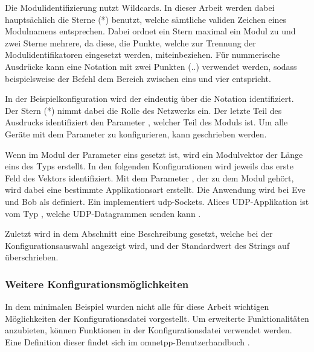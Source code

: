 Die Modulidentifizierung nutzt Wildcards. In dieser Arbeit werden dabei hauptsächlich die Sterne (*) benutzt, welche sämtliche validen Zeichen eines Modulnamens entsprechen. Dabei ordnet ein Stern maximal ein Modul zu und zwei Sterne mehrere, da diese, die Punkte, welche zur Trennung der Modulidentifikatoren eingesetzt werden, miteinbeziehen. Für nummerische Ausdrücke kann eine Notation mit zwei Punkten (..) verwendet werden, sodass beispielsweise der Befehl \ini{[1..4]} dem Bereich zwischen eins und vier entspricht.

In der Beispielkonfiguration wird der  eindeutig über die Notation  identifiziert. Der Stern (*) nimmt dabei die Rolle des Netzwerks  ein. Der letzte Teil des Ausdrucks  identifiziert den Parameter , welcher Teil des Moduls  ist. Um alle Geräte mit dem Parameter  zu konfigurieren, kann  geschrieben werden.

Wenn im Modul  der Parameter eins  gesetzt ist, wird ein Modulvektor der Länge eins des Typs  erstellt. In den folgenden Konfigurationen wird jeweils das erste Feld des Vektors  identifiziert. Mit dem Parameter , der zu dem Modul  gehört, wird dabei eine bestimmte Applikationsart erstellt. Die Anwendung  wird bei Eve und Bob als  definiert. Ein  implementiert \gls{udp}-Sockets. Alices UDP-Applikation ist vom Typ , welche UDP-Datagrammen senden kann \cite[]{InetManual2014}. 

Zuletzt wird in dem Abschnitt  eine Beschreibung  gesetzt, welche bei der Konfigurationsauswahl angezeigt wird, und der Standardwert des Strings  auf  überschrieben.

\subsubsection{Weitere Konfigurationsmöglichkeiten}
In dem minimalen Beispiel wurden nicht alle für diese Arbeit wichtigen Möglichkeiten der Konfigurationsdatei vorgestellt. Um erweiterte Funktionalitäten anzubieten, können Funktionen in der Konfigurationsdatei verwendet werden. Eine Definition dieser findet sich im \gls{omnetpp}-Benutzerhandbuch \cite[]{OmnetManual}.


